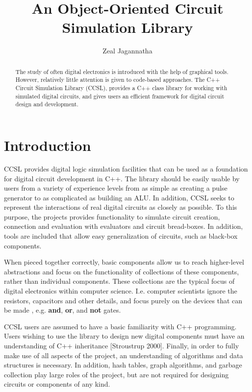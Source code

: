 \documentclass{article}
\newcommand{\Bold}[1]{\textbf{#1}}
\begin{document}

\title{An Object-Oriented Circuit Simulation Library}
\author{Zeal Jagannatha}

\maketitle

\begin{abstract}

The study of often digital electronics is introduced with the help of graphical tools. However, relatively little attention is given to code-based approaches. The C++ Circuit Simulation Library (CCSL), provides a C++ class library for working with simulated digital circuits, and gives users an efficient framework for digital circuit design and development.

\end{abstract}

\section{Introduction}

CCSL provides digital logic simulation facilities that can be used as a foundation for digital circuit development in C++. The library should be easily usable by users from a variety of experience levels from as simple as creating a pulse generator to as complicated as building an ALU. In addition, CCSL seeks to represent the interactions of real digital circuits as closely as possible. To this purpose, the projects provides functionality to simulate circuit creation, connection and evaluation with evaluators and circuit bread-boxes. In addition, tools are included that allow easy generalization of circuits, such as black-box components.

When pieced together correctly, basic components allow us to reach higher-level abstractions and focus on the functionality of collections of these components, rather than individual components. These collections are the typical focus of digital electronics within computer science. I.e. computer scientists ignore the resistors, capacitors and other details, and focus purely on the devices that can be made , e.g. \Bold{and}, \Bold{or}, and \Bold{not} gates.

CCSL users are assumed to have a basic familiarity with C++ programming. Users wishing to use the library to design new digital components must have an understanding of C++ inheritance [Stroustrup 2000]. Finally, in order to fully make use of all aspects of the project, an understanding of algorithms and data structures is necessary. In addition, hash tables, graph algorithms, and garbage collection play large roles of the project, but are not required for designing circuits or components of any kind.
\end{document}
